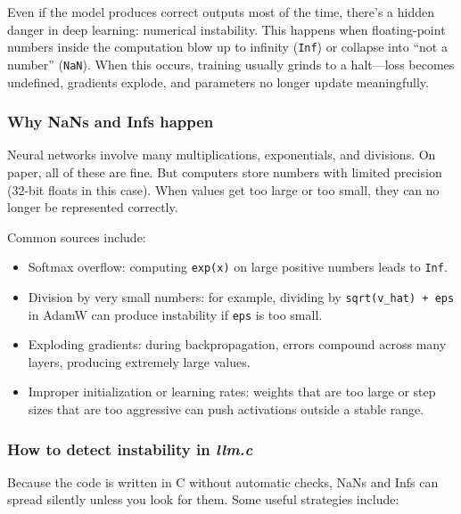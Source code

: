 \documentclass[
  letterpaper,
  DIV=11,
  numbers=noendperiod]{scrreprt}
\providecommand{\tightlist}{%
  \setlength{\itemsep}{0pt}\setlength{\parskip}{0pt}}
\begin{document}
Even if the model produces correct outputs most of the time, there's a
hidden danger in deep learning: numerical instability. This happens when
floating-point numbers inside the computation blow up to infinity
(\texttt{Inf}) or collapse into ``not a number'' (\texttt{NaN}). When
this occurs, training usually grinds to a halt---loss becomes undefined,
gradients explode, and parameters no longer update meaningfully.

\subsubsection{Why NaNs and Infs happen}\label{why-nans-and-infs-happen}

Neural networks involve many multiplications, exponentials, and
divisions. On paper, all of these are fine. But computers store numbers
with limited precision (32-bit floats in this case). When values get too
large or too small, they can no longer be represented correctly.

Common sources include:

\begin{itemize}
\tightlist
\item
  Softmax overflow: computing \texttt{exp(x)} on large positive numbers
  leads to \texttt{Inf}.
\item
  Division by very small numbers: for example, dividing by
  \texttt{sqrt(v\_hat)\ +\ eps} in AdamW can produce instability if
  \texttt{eps} is too small.
\item
  Exploding gradients: during backpropagation, errors compound across
  many layers, producing extremely large values.
\item
  Improper initialization or learning rates: weights that are too large
  or step sizes that are too aggressive can push activations outside a
  stable range.
\end{itemize}

\subsubsection{\texorpdfstring{How to detect instability in
\emph{llm.c}}{How to detect instability in llm.c}}\label{how-to-detect-instability-in-llm.c}

Because the code is written in C without automatic checks, NaNs and Infs
can spread silently unless you look for them. Some useful strategies
include:
\end{document}
